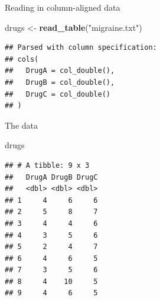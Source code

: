 \documentclass[ignorenonframetext,]{beamer}
\newenvironment{Shaded}{\begin{snugshade}}{\end{snugshade}}
\newcommand{\KeywordTok}[1]{\textcolor[rgb]{0.13,0.29,0.53}{\textbf{#1}}}
\newcommand{\NormalTok}[1]{#1}
\newcommand{\StringTok}[1]{\textcolor[rgb]{0.31,0.60,0.02}{#1}}
\begin{document}
\begin{frame}[fragile]{Reading in column-aligned data}
\protect\hypertarget{reading-in-column-aligned-data}{}

\begin{Shaded}
\begin{Highlighting}[]
\NormalTok{drugs <-}\StringTok{ }\KeywordTok{read_table}\NormalTok{(}\StringTok{"migraine.txt"}\NormalTok{)}
\end{Highlighting}
\end{Shaded}

\begin{verbatim}
## Parsed with column specification:
## cols(
##   DrugA = col_double(),
##   DrugB = col_double(),
##   DrugC = col_double()
## )
\end{verbatim}

\end{frame}

\begin{frame}[fragile]{The data}
\protect\hypertarget{the-data-1}{}

\begin{Shaded}
\begin{Highlighting}[]
\NormalTok{drugs}
\end{Highlighting}
\end{Shaded}

\begin{verbatim}
## # A tibble: 9 x 3
##   DrugA DrugB DrugC
##   <dbl> <dbl> <dbl>
## 1     4     6     6
## 2     5     8     7
## 3     4     4     6
## 4     3     5     6
## 5     2     4     7
## 6     4     6     5
## 7     3     5     6
## 8     4    10     5
## 9     4     6     5
\end{verbatim}

\end{frame}
\end{document}
